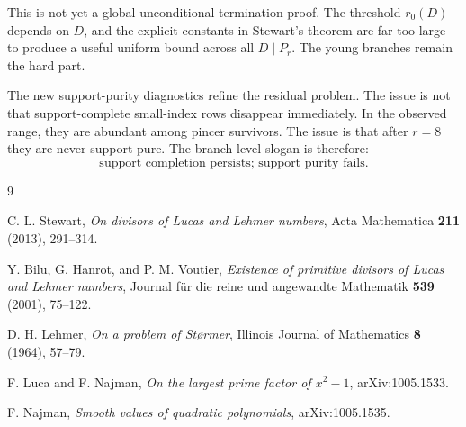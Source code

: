 \documentclass[11pt]{article}
\theoremstyle{definition}
\begin{document}
This is not yet a global unconditional termination proof.  The threshold
$r_0(D)$ depends on $D$, and the explicit constants in Stewart's theorem are far
too large to produce a useful uniform bound across all $D\mid P_r$.  The young
branches remain the hard part.

The new support-purity diagnostics refine the residual problem.  The issue is not
that support-complete small-index rows disappear immediately.  In the observed
range, they are abundant among pincer survivors.  The issue is that after $r=8$
they are never support-pure.  The branch-level slogan is therefore:
\[
  \boxed{\text{support completion persists; support purity fails.}}
\]

\begin{thebibliography}{9}

C. L. Stewart,
\emph{On divisors of Lucas and Lehmer numbers},
Acta Mathematica \textbf{211} (2013), 291--314.

Y. Bilu, G. Hanrot, and P. M. Voutier,
\emph{Existence of primitive divisors of Lucas and Lehmer numbers},
Journal f\"ur die reine und angewandte Mathematik \textbf{539} (2001), 75--122.

D. H. Lehmer,
\emph{On a problem of St\o rmer},
Illinois Journal of Mathematics \textbf{8} (1964), 57--79.

F. Luca and F. Najman,
\emph{On the largest prime factor of $x^2-1$},
arXiv:1005.1533.

F. Najman,
\emph{Smooth values of quadratic polynomials},
arXiv:1005.1535.

\end{thebibliography}
\end{document}

